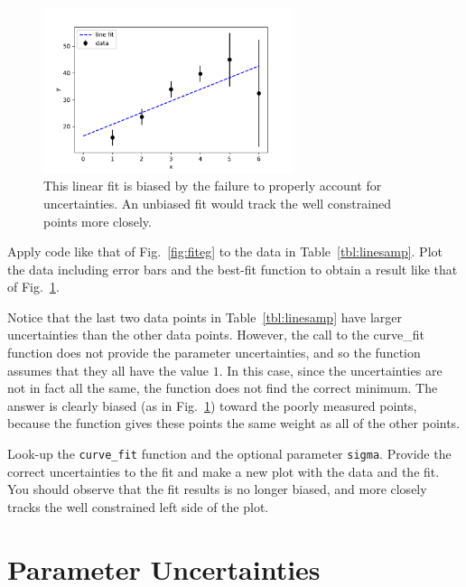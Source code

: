 \begin{figure}[htbp]
\begin{center}
\includegraphics[width=0.65\textwidth]{figs/labs/fitting/bias.pdf} 
\caption{This linear fit is biased by the failure to properly account for uncertainties.  An unbiased fit would track the well constrained points more closely.}
\label{fig:fitbias}
\end{center}
\end{figure}

\begin{plot}
Apply code like that of Fig.~\ref{fig:fiteg} to the data in
Table~\ref{tbl:linesamp}. Plot the data including error bars and the
best-fit function to obtain a result like that of Fig.~\ref{fig:fitbias}.
\end{plot}

Notice that the last two data points in Table~\ref{tbl:linesamp} have
larger uncertainties than the other data points.  However, the call to
the {curve{\_}fit} function does not provide the parameter
uncertainties, and so the function assumes that they all have the
value $1$.  In this case, since the uncertainties are not in fact all
the same, the function does not find the correct minimum.  The answer
is clearly biased (as in Fig.~\ref{fig:fitbias}) toward the poorly
measured points, because the function gives these points the same
weight as all of the other points.

\begin{plot}
Look-up the {\tt curve{\_}fit} function and the optional parameter
{\tt sigma}. Provide the correct uncertainties to the fit and make a
new plot with the data and the fit.  You should observe that the fit
results is no longer biased, and more closely tracks the well
constrained left side of the plot.
\end{plot}

\section{Parameter Uncertainties}

